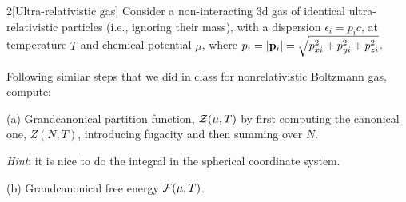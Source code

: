 \documentclass[12pt]{article}
\begin{document}
\begin{problem}{2}[Ultra-relativistic gas]
Consider a non-interacting 3d gas of identical ultra-relativistic particles
(i.e., ignoring their mass), with a dispersion $\epsilon_i=p_ic$, at temperature
$T$ and chemical potential $\mu$, where
$p_i=\abs{\vb{p}_i}=\sqrt{p_{xi}^2+p_{yi}^2+p_{zi}^2}$.

Following similar steps that we did in class for nonrelativistic Boltzmann gas,
compute:

(a) Grandcanonical partition function, $\mathcal{Z}(\mu,T)$ by first computing the
canonical one, $Z(N,T)$, introducing fugacity and then summing over $N$.

\textit{Hint}: it is nice to do the integral in the spherical coordinate system.

\begin{solution}
    
\end{solution}

(b) Grandcanonical free energy $\mathcal{F}(\mu,T)$.

\begin{solution}
\end{solution}
\end{problem}
\newpage
\end{document}
